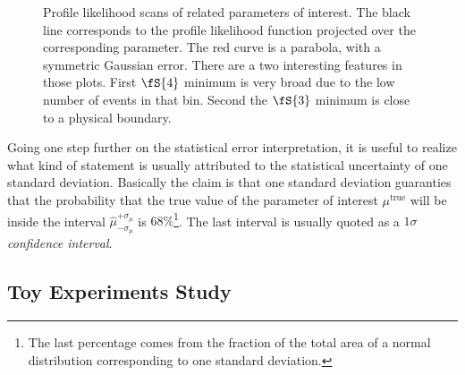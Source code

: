 \begin{figure}[!t]
  \begin{subfigure}{0.5\textwidth}
    \scalebox{0.57}{}
    \caption{}
    \label{nll_ASMag2_bin3}
  \end{subfigure}%
  \hfill%
  \begin{subfigure}{0.5\textwidth}
    \scalebox{0.57}{}
    \caption{}
    \label{nll_ASPhase_bin3}
  \end{subfigure}
  \begin{subfigure}{0.5\textwidth}
    \scalebox{0.57}{}
    \caption{}
    \label{nll_ASMag2_bin4}
  \end{subfigure}%
  \hfill%
  \begin{subfigure}{0.5\textwidth}
    \scalebox{0.57}{}
    \caption{}
    \label{nll_ASPhase_bin4}
  \end{subfigure}
\caption{Profile likelihood scans of \swave related parameters of interest. The black line corresponds to the profile likelihood
         function projected over the corresponding parameter. The red curve is a parabola, with a symmetric Gaussian
         error. There are a two interesting features in those plots. First $\fS{4}$ minimum is very broad due to the
         low number of events in that \mkpi bin. Second the $\fS{3}$ minimum is close to a physical boundary.}
\end{figure}

Going one step further on the statistical error interpretation, it is useful to realize what kind of statement is usually
attributed to the statistical uncertainty of one standard deviation. Basically the claim is that one standard deviation
guaranties that the probability that the true value of the parameter of interest $\mu^{\text{true}}$ will be inside the
interval $\hat{\mu}_{-\sigma_\mu}^{+\sigma_\mu}$ is $68\%$\footnote{The last percentage comes from the fraction of the total area of a normal distribution corresponding to one standard deviation.}.
The last interval is usually quoted as a $1\sigma$ {\it confidence interval}.





\subsection{Toy Experiments Study}
\label{Toy_Experiments_Study}

